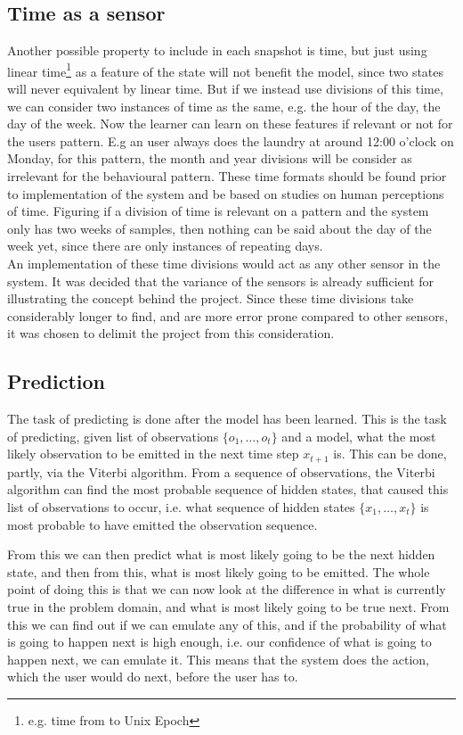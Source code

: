 \subsection{Time as a sensor}
Another possible property to include in each snapshot is time, but just using linear time\footnote{e.g. time from to Unix Epoch\cite{unix_epoch}} as a feature of the state will not benefit the model, since two states will never equivalent by linear time. But if we instead use divisions of this time, we can consider two instances of time as the same, e.g. the hour of the day, the day of the week. Now the learner can learn on these features if relevant or not for the users pattern. E.g an user always does the laundry at around 12:00 o'clock on Monday, for this pattern, the month and year divisions will be consider as irrelevant for the behavioural pattern. These time formats should be found prior to implementation of the system and be based on studies on human perceptions of time. Figuring if a division of time is relevant on a pattern and the system only has two weeks of samples, then nothing can be said about the day of the week yet, since there are only instances of repeating days.\\
An implementation of these time divisions would act as any other sensor in the system. It was decided that the variance of the sensors is already sufficient for illustrating the concept behind the project. Since these time divisions take considerably longer to find, and are more error prone compared to other sensors, it was chosen to delimit the project from this consideration.

\subsection{Prediction}\label{sub:Prediction}
The task of predicting is done after the model has been learned. This is the task of predicting, given list of observations $\{o_1,\dots,o_t\}$ and a model, what the most likely observation to be emitted in the next time step $x_{t+1}$ is. This can be done, partly, via the Viterbi algorithm\cite{russell2010artificial}. From a sequence of observations, the Viterbi algorithm can find the most probable sequence of hidden states, that caused this list of observations to occur, i.e. what sequence of hidden states $\{x_1,\dots,x_t\}$ is most probable to have emitted the observation sequence.

From this we can then predict what is most likely going to be the next hidden state, and then from this, what is most likely going to be emitted. The whole point of doing this is that we can now look at the difference in what is currently true in the problem domain, and what is most likely going to be true next. From this we can find out if we can emulate any of this, and if the probability of what is going to happen next is high enough, i.e. our confidence of what is going to happen next, we can emulate it. This means that the system does the action, which the user would do next, before the user has to.
